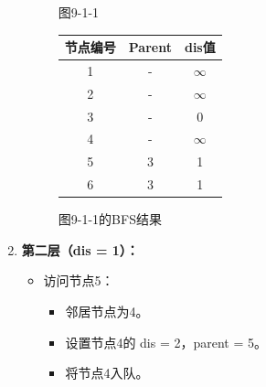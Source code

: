 \documentclass{article}
\begin{document}
\begin{enumerate}
\begin{figure}[htbp]
\begin{minipage}[b]{0.6\textwidth}
            \caption{图9-1-1}
            \label{fig:9-1-1}
        \end{minipage}%
        \hfill%
        \begin{minipage}[b]{0.4\textwidth}    %
            \centering
            \begin{tabular}{|c|c|c|}
                \hline
                节点编号 & Parent & dis值 \\
                \hline
                1 & - & $\infty$ \\
                2 & - & $\infty$ \\
                3 & - & 0 \\
                4 & - & $\infty$ \\
                5 & 3 & 1 \\
                6 & 3 & 1 \\
                \hline
            \end{tabular}
            \caption{图9-1-1的BFS结果}
            \label{tab:graph9-1-1-bfs}
        \end{minipage}
    \end{figure}
    
    \pagebreak

    \item \textbf{第二层（dis = 1）：}
        \begin{itemize}
            \item 访问节点5：
            \begin{itemize}
                \item 邻居节点为4。
                \item 设置节点4的 dis = 2，parent = 5。
                \item 将节点4入队。
            \end{itemize}
        \end{itemize}


\end{enumerate}
\end{document}
